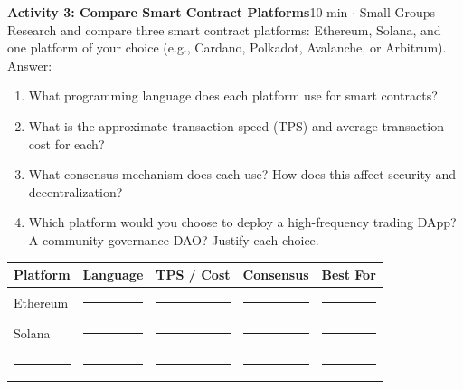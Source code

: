 \documentclass[11pt,a4paper]{article}
\newcommand{\activitybox}[3]{%
  \noindent\colorbox{mllavender4}{\parbox{\dimexpr\linewidth-2\fboxsep}{%
    \textbf{\color{mlpurple}#1}\hfill\textcolor{mlgray}{\small #2}\\[2pt]#3%
  }}\par\vspace{4pt}%
}
\newcommand{\fillcell}{\rule{2.2cm}{0.3pt}}
\begin{document}
\activitybox{Activity 3: Compare Smart Contract Platforms}{10 min $\cdot$ Small Groups}{%
Research and compare three smart contract platforms: Ethereum, Solana, and one platform of your choice (e.g., Cardano, Polkadot, Avalanche, or Arbitrum). Answer:
\begin{enumerate}
\item What programming language does each platform use for smart contracts?
\item What is the approximate transaction speed (TPS) and average transaction cost for each?
\item What consensus mechanism does each use? How does this affect security and decentralization?
\item Which platform would you choose to deploy a high-frequency trading DApp? A community governance DAO? Justify each choice.
\end{enumerate}
\vspace{4pt}
{\footnotesize\renewcommand{\arraystretch}{1.35}%
\setlength{\tabcolsep}{5pt}%
\begin{tabular}{@{}p{2.4cm}p{2.4cm}p{2.4cm}p{2.0cm}p{2.8cm}@{}}
\toprule
\textbf{Platform} & \textbf{Language} & \textbf{TPS / Cost} & \textbf{Consensus} & \textbf{Best For} \\
\midrule
Ethereum         & \fillcell & \fillcell & \fillcell & \fillcell \\
Solana           & \fillcell & \fillcell & \fillcell & \fillcell \\
\fillcell        & \fillcell & \fillcell & \fillcell & \fillcell \\
\bottomrule
\end{tabular}}
\vspace{2pt}
}

\vspace{2pt}
\end{document}
